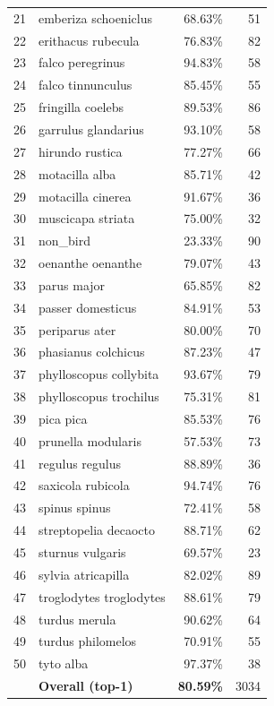 \documentclass[conference]{IEEEtran}
\begin{document}
\begin{table}[h]
\begin{tabular}{llrr}
21 & emberiza schoeniclus       &  68.63\% & 51 \\
22 & erithacus rubecula         &  76.83\% & 82 \\
23 & falco peregrinus           &  94.83\% & 58 \\
24 & falco tinnunculus          &  85.45\% & 55 \\
25 & fringilla coelebs          &  89.53\% & 86 \\
26 & garrulus glandarius        &  93.10\% & 58 \\
27 & hirundo rustica            &  77.27\% & 66 \\
28 & motacilla alba             &  85.71\% & 42 \\
29 & motacilla cinerea          &  91.67\% & 36 \\
30 & muscicapa striata          &  75.00\% & 32 \\
31 & non\_bird                  &  23.33\% & 90 \\
32 & oenanthe oenanthe          &  79.07\% & 43 \\
33 & parus major                &  65.85\% & 82 \\
34 & passer domesticus          &  84.91\% & 53 \\
35 & periparus ater             &  80.00\% & 70 \\
36 & phasianus colchicus        &  87.23\% & 47 \\
37 & phylloscopus collybita     &  93.67\% & 79 \\
38 & phylloscopus trochilus     &  75.31\% & 81 \\
39 & pica pica                  &  85.53\% & 76 \\
40 & prunella modularis         &  57.53\% & 73 \\
41 & regulus regulus            &  88.89\% & 36 \\
42 & saxicola rubicola          &  94.74\% & 76 \\
43 & spinus spinus              &  72.41\% & 58 \\
44 & streptopelia decaocto      &  88.71\% & 62 \\
45 & sturnus vulgaris           &  69.57\% & 23 \\
46 & sylvia atricapilla         &  82.02\% & 89 \\
47 & troglodytes troglodytes    &  88.61\% & 79 \\
48 & turdus merula              &  90.62\% & 64 \\
49 & turdus philomelos          &  70.91\% & 55 \\
50 & tyto alba                  &  97.37\% & 38 \\
\midrule
   & \textbf{Overall (top-1)}   & \textbf{80.59\%} & 3034 \\
\bottomrule
\end{tabular}
\end{table}
\end{document}
